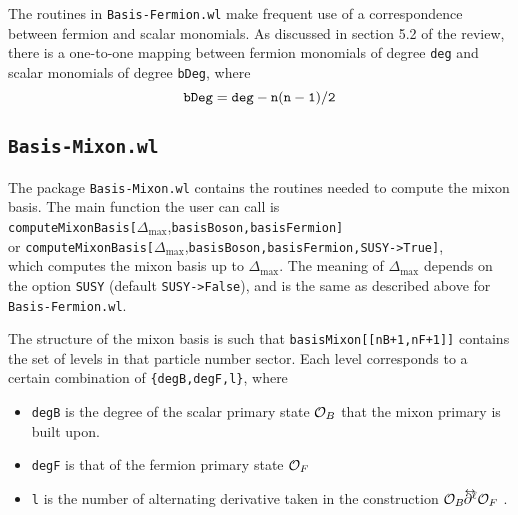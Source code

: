 \documentclass[12pt]{article}
\newcommand{\CO}{{\cal O}}
\newcommand\De\Delta
\newcommand{\Dmax}{\De_{\max}}
\newcommand\lrpar{\raise .8ex\hbox{$^\leftrightarrow$} \hspace{-9pt}
\partial}
\begin{document}
The routines in {\tt Basis-Fermion.wl} make frequent use of a correspondence between fermion and scalar monomials. As discussed in section 5.2 of the review, there is a one-to-one mapping between fermion monomials of degree {\tt deg} and scalar monomials of degree {\tt  bDeg}, where 
\begin{equation*}
{\tt bDeg = deg - n(n-1)/2 }
\end{equation*}

\subsection{{\tt Basis-Mixon.wl}}
The package  {\tt Basis-Mixon.wl} contains the routines needed to compute the mixon basis. The main function the user can call is \\
{\tt computeMixonBasis[}$\Delta_{\textrm{max} } $,{\tt basisBoson,basisFermion]} \\
or {\tt computeMixonBasis[}$\Delta_{\textrm{max} } $,{\tt basisBoson,basisFermion,SUSY->True]},\\ 
which computes the mixon basis up to $\Dmax$. The meaning of $\Dmax$ depends on the option {\tt SUSY} (default {\tt SUSY->False}), and is the same as described above for  {\tt Basis-Fermion.wl}.

The structure of the mixon basis is such that
    {\tt basisMixon[[nB+1,nF+1]]}
contains the set of levels in that particle number sector.
Each level corresponds to a certain combination of {\tt \{degB,degF,l\}},
where
\begin{itemize}
\item {\tt degB} is the degree of the scalar primary state $\CO_B$ that the mixon primary is built upon.
\item {\tt degF} is that of the fermion primary state $\CO_F$
\item {\tt l} is the number of alternating derivative taken in the construction $\CO_B \lrpar^\ell \CO_F$ .
\end{itemize}
\end{document}
